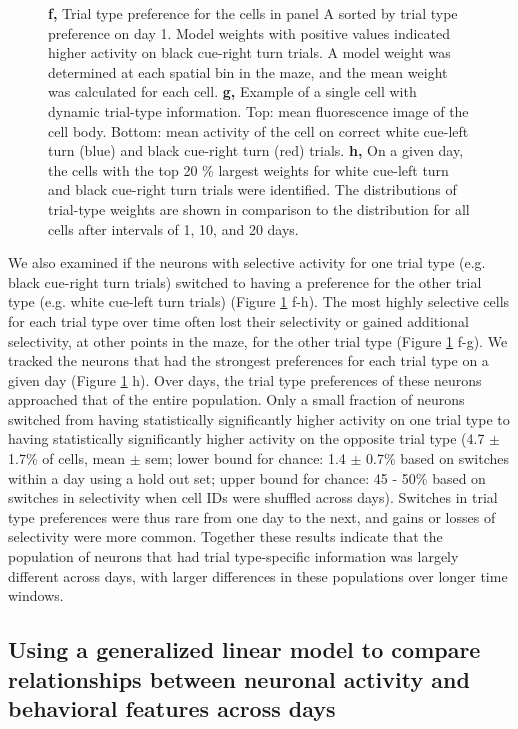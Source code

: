 \begin{figure}
{%
\textbf{f,} Trial type preference for the cells in panel A sorted by trial type preference on day 1. Model weights with positive values indicated higher activity on black cue-right turn trials. A model weight was determined at each spatial bin in the maze, and the mean weight was calculated for each cell. 
%
\textbf{g,} Example of a single cell with dynamic trial-type information. Top: mean fluorescence image of the cell body. Bottom: mean activity of the cell on correct white cue-left turn (blue) and black cue-right turn (red) trials. 
%
\textbf{h,} On a given day, the cells with the top 20 $\%$ largest weights for white cue-left turn and black cue-right turn trials were identified. The distributions of trial-type weights are shown in comparison to the distribution for all cells after intervals of 1, 10, and 20 days.
\label{fig:3_all}}
\end{figure}

\bigskip

We also examined if the neurons with selective activity for one trial type (e.g. black cue-right turn trials) switched to having a preference for the other trial type (e.g. white cue-left turn trials) (Figure \ref{fig:3_all} f-h). The most highly selective cells for each trial type over time often lost their selectivity or gained additional selectivity, at other points in the maze, for the other trial type (Figure \ref{fig:3_all} f-g). We tracked the neurons that had the strongest preferences for each trial type on a given day (Figure \ref{fig:3_all} h). Over days, the trial type preferences of these neurons approached that of the entire population. Only a small fraction of neurons switched from having statistically significantly higher activity on one trial type to having statistically significantly higher activity on the opposite trial type (4.7 $\pm$ 1.7$\%$ of cells, mean $\pm$ sem; lower bound for chance: 1.4 $\pm$ 0.7$\%$ based on switches within a day using a hold out set; upper bound for chance: 45 - 50$\%$ based on switches in selectivity when cell IDs were shuffled across days). Switches in trial type preferences were thus rare from one day to the next, and gains or losses of selectivity were more common. Together these results indicate that the population of neurons that had trial type-specific information was largely different across days, with larger differences in these populations over longer time windows. 

\subsection{Using a generalized linear model to compare relationships between neuronal activity and behavioral features across days} \label{sec:chap3_glm_intro}

